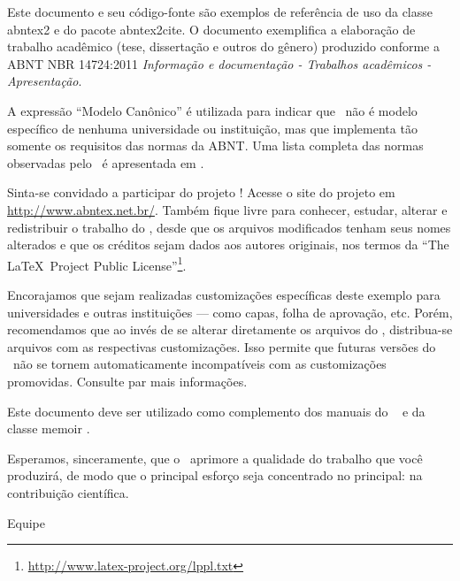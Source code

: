\documentclass[
	12pt,				%
	openright,			%
	twoside,			%
	a4paper,			%
	english,			%
	french,				%
	spanish,			%
	brazil				%
	]{abntex2}
\begin{document}



Este documento e seu código-fonte são exemplos de referência de uso da classe
\textsf{abntex2} e do pacote \textsf{abntex2cite}. O documento 
exemplifica a elaboração de trabalho acadêmico (tese, dissertação e outros do
gênero) produzido conforme a ABNT NBR 14724:2011 \emph{Informação e documentação
- Trabalhos acadêmicos - Apresentação}.


A expressão ``Modelo Canônico'' é utilizada para indicar que \abnTeX\ não é
modelo específico de nenhuma universidade ou instituição, mas que implementa tão
somente os requisitos das normas da ABNT. Uma lista completa das normas
observadas pelo \abnTeX\ é apresentada em .

Sinta-se convidado a participar do projeto \abnTeX! Acesse o site do projeto em
\url{http://www.abntex.net.br/}. Também fique livre para conhecer,
estudar, alterar e redistribuir o trabalho do \abnTeX, desde que os arquivos
modificados tenham seus nomes alterados e que os créditos sejam dados aos
autores originais, nos termos da ``The \LaTeX\ Project Public
License''\footnote{\url{http://www.latex-project.org/lppl.txt}}.

Encorajamos que sejam realizadas customizações específicas deste exemplo para
universidades e outras instituições --- como capas, folha de aprovação, etc.
Porém, recomendamos que ao invés de se alterar diretamente os arquivos do
\abnTeX, distribua-se arquivos com as respectivas customizações.
Isso permite que futuras versões do \abnTeX~não se tornem automaticamente
incompatíveis com as customizações promovidas. Consulte
 par mais informações.

Este documento deve ser utilizado como complemento dos manuais do \abnTeX\ 
\cite{abntex2classe,abntex2cite,abntex2cite-alf} e da classe \textsf{memoir}
\cite{memoir}. 

Esperamos, sinceramente, que o \abnTeX\ aprimore a qualidade do trabalho que
você produzirá, de modo que o principal esforço seja concentrado no principal:
na contribuição científica.

Equipe \abnTeX 
\end{document}
